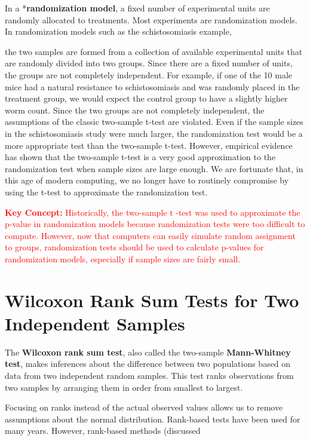 \documentclass[
]{report}
\begin{document}
In a *\textbf{randomization model}, a fixed number of experimental units are randomly allocated to treatments. Most experiments are randomization models. In randomization models such as the schistosomiasis example,

the two samples are formed from a collection of available experimental units that are randomly divided into two groups. Since there are a fixed number of units, the groups are not completely independent. For example,
if one of the 10 male mice had a natural resistance to schistosomiasis and was randomly placed in the treatment group, we would expect the control group to have a slightly higher worm count. Since the two groups are not completely independent, the assumptions of the classic two-sample t-test are violated. Even if the sample sizes in the schistosomiasis study were much larger, the randomization test would be a more appropriate test than the two-sample t-test. However, empirical evidence has shown that the two-sample t-test is a very good approximation to the randomization test when sample sizes are large enough. We are fortunate that, in this age of modern computing, we no longer have to routinely compromise by using the t-test to approximate the randomization test.

\Large

\textbf{\textcolor{red}{Key Concept:}}
\textcolor{red}{Historically, the two-sample t -test was used to approximate the p-value in randomization models because randomization tests were too difficult to compute. However, now that computers can easily simulate random assignment to groups, randomization tests should be used to calculate p-values for randomization models, especially if sample sizes are fairly small.}

\normalsize

\section{\texorpdfstring{\textbf{Wilcoxon Rank Sum Tests for Two Independent Samples}}{Wilcoxon Rank Sum Tests for Two Independent Samples}}\label{wilcoxon-rank-sum-tests-for-two-independent-samples}

The \textbf{Wilcoxon rank sum test}, also called the two-sample \textbf{Mann-Whitney test}, makes inferences about the difference between two populations based on data from two independent random samples. This test ranks observations from two samples by arranging them in order from smallest to largest.

Focusing on ranks instead of the actual observed values allows us to remove assumptions about the normal distribution. Rank-based tests have been used for many years. However, rank-based methods (discussed
\end{document}
